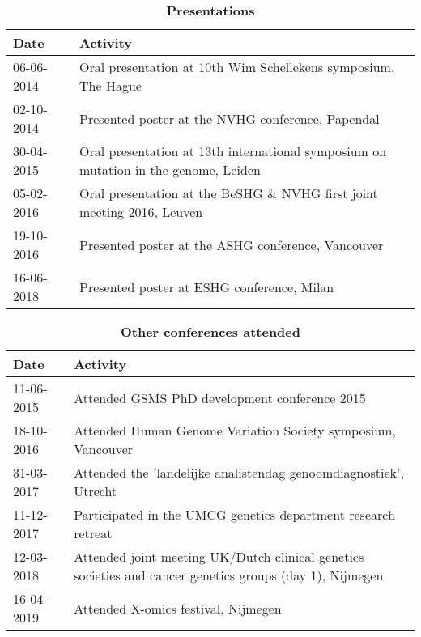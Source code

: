 \begin{appendices}
\begin{table}
	\caption*{\textbf{Presentations}}
	\footnotesize
	\begin{tabulary}{\linewidth}{LL}
		Date & Activity \\
		\hline
			\rule{0pt}{2.6ex}\mbox{06-06-2014 } & Oral presentation at 10th Wim Schellekens symposium, The Hague \\
			\rule{0pt}{2.6ex}\mbox{02-10-2014 } & Presented poster at the NVHG conference, Papendal \\
			\rule{0pt}{2.6ex}\mbox{30-04-2015 } & Oral presentation at 13th international symposium on mutation in the genome, Leiden \\
			\rule{0pt}{2.6ex}\mbox{05-02-2016 } & Oral presentation at the BeSHG \& NVHG first joint meeting 2016, Leuven \\
			\rule{0pt}{2.6ex}\mbox{19-10-2016 } & Presented poster at the ASHG conference, Vancouver\\
			\rule{0pt}{2.6ex}\mbox{16-06-2018 } & Presented poster at ESHG conference, Milan \\
			\hline
\end{tabulary}
\label{table:appendix_activities_2}
\end{table}

\clearpage



\begin{table}
	\caption*{\textbf{Other conferences attended}}
	\footnotesize
	\begin{tabulary}{\linewidth}{p{1.1cm}L}
		Date & Activity \\
		\hline
		\rule{0pt}{2.6ex}\mbox{11-06-2015 } & Attended GSMS PhD development conference 2015 \\
		\rule{0pt}{2.6ex}\mbox{18-10-2016 } & Attended Human Genome Variation Society symposium, Vancouver \\
		\rule{0pt}{2.6ex}\mbox{31-03-2017 } & Attended the 'landelijke analistendag genoomdiagnostiek', Utrecht \\
		\rule{0pt}{2.6ex}\mbox{11-12-2017 } & Participated in the UMCG genetics department research retreat \\
		\rule{0pt}{2.6ex}\mbox{12-03-2018 } & Attended joint meeting UK/Dutch clinical genetics societies and cancer genetics groups (day 1), Nijmegen \\
		\rule{0pt}{2.6ex}\mbox{16-04-2019 } & Attended X-omics festival, Nijmegen \\
		\hline
	\end{tabulary}
	\label{table:appendix_activities_3}
\end{table}




\end{appendices}
